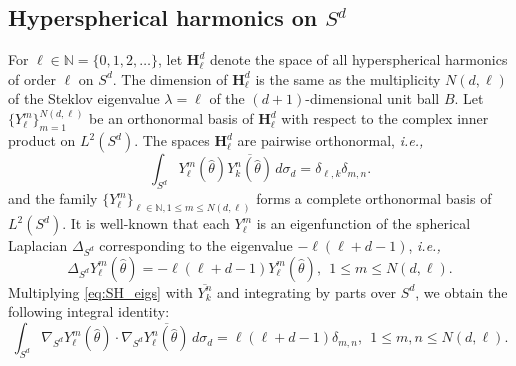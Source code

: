 \documentclass[11pt]{amsart}
\theoremstyle{definition}
\theoremstyle{plain}
\theoremstyle{remark}
\newcommand{\N}{\mathbb{N}}
\newcommand{\ie}{{\it{i.e.}, }}
\newcommand{\cc}{\overline}
\begin{document}
\subsection{Hyperspherical harmonics on $S^d$} \label{sec:Harmonics} 
For $\ell\in\N = \{0, 1, 2, \dots\}$, let $\mathbf{H}_\ell^d$ denote the space of all hyperspherical harmonics of order $\ell$ on $S^d$. The dimension of $\mathbf{H}_\ell^d$ is the same as the multiplicity $N(d, \ell)$ of the Steklov eigenvalue $\lambda = \ell$ of the $(d + 1)$-dimensional unit ball $B$. Let $\{Y_\ell^m\}_{m = 1}^{N(d, \ell)}$ be an orthonormal basis of $\mathbf{H}_\ell^d$ with respect to the complex inner product on $L^2(S^d)$. The spaces $\mathbf{H}_\ell^d$ are pairwise orthonormal, \ie 
\begin{equation*} 
\int_{S^d} Y_\ell^m(\hat\theta)\cc{Y_k^n(\hat\theta)}\, d\sigma_d = \delta_{\ell, k}\delta_{m, n}. 
\end{equation*} 
and the family $\{Y_\ell^m\}_{\ell \in \N, 1 \leq m \leq N(d,\ell)}$ forms a complete orthonormal basis of $L^2(S^d)$.
It is well-known that each $Y_\ell^m$ is an eigenfunction of the spherical Laplacian $\Delta_{S^d}$ corresponding to the eigenvalue $-\ell(\ell + d - 1)$, \ie 
\begin{equation} \label{eq:SH_eigs} 
\Delta_{S^d}Y_\ell^m(\hat\theta) = -\ell(\ell + d - 1)Y_\ell^m(\hat\theta), \ \ 1\le m\le N(d, \ell). 
\end{equation} 
Multiplying \eqref{eq:SH_eigs} with $\cc{Y_k^n}$ and integrating by parts over $S^d$, we obtain the following integral identity: 
\begin{equation} \label{eq:SH_eigs_grad} 
\int_{S^d} \nabla_{S^d}Y_\ell^m(\hat\theta)\cdot \nabla_{S^d}\cc{Y_\ell^n(\hat\theta)}\, d\sigma_d = \ell(\ell + d - 1)\delta_{m, n}, \ \ 1\le m, n\le N(d, \ell). 
\end{equation} 
\end{document}

